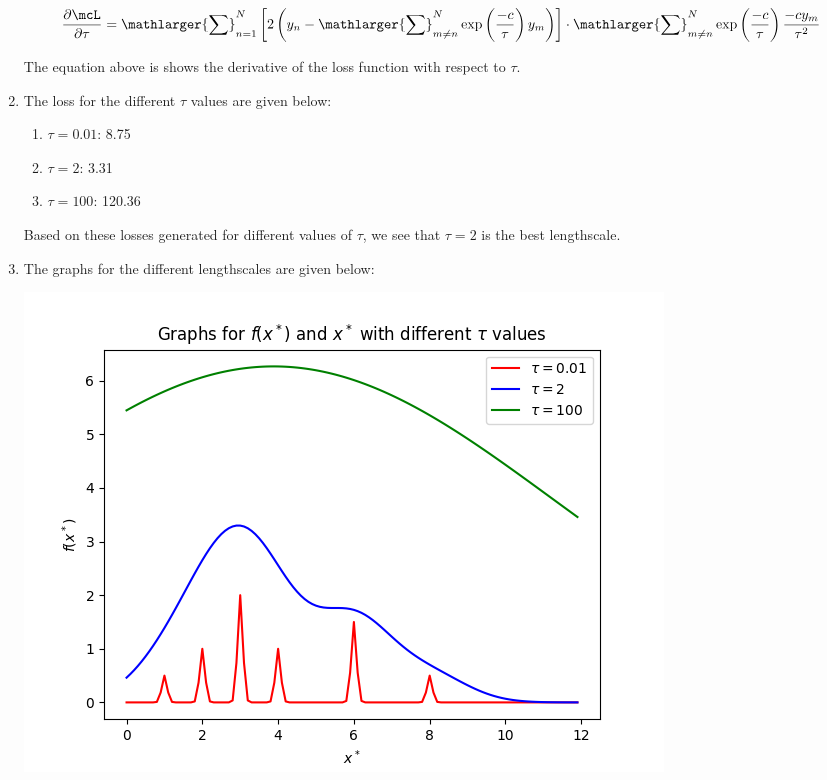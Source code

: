 \documentclass[submit]{harvardml}
\begin{document}
\begin{solution}
\begin{enumerate}
    \[\frac{\partial\mcL}{\partial\tau} = \mathlarger{\sum}^N_{n=1}\left[2\left(y_n-\mathlarger{\sum}^N_{m\neq n} \exp\left(\frac{-c}{\tau} \right)y_m\right)\right]\cdot\mathlarger{\sum}^N_{m\neq n}\exp\left(\frac{-c}{\tau} \right)\frac{-c y_m}{\tau^2}\]
    
    The equation above is shows the derivative of the loss function with respect to $\tau$.
    \\
    
    \item The loss for the different $\tau$ values are given below:
        \begin{enumerate}
            \item[] $\tau = 0.01$: 8.75
            
            \item[] $\tau = 2$: 3.31
            
            \item[] $\tau = 100$: 120.36
        \end{enumerate}
        
    Based on these losses generated for different values of $\tau$, we see that $\tau = 2$ is the best lengthscale.
    
    \item The graphs for the different lengthscales are given below:
    \begin{center}
    \includegraphics[width=0.8\columnwidth]{latex hw/Pset1_graph1_CS181.png}
    \end{center}
    

\end{enumerate}
\end{solution}
\end{document}
